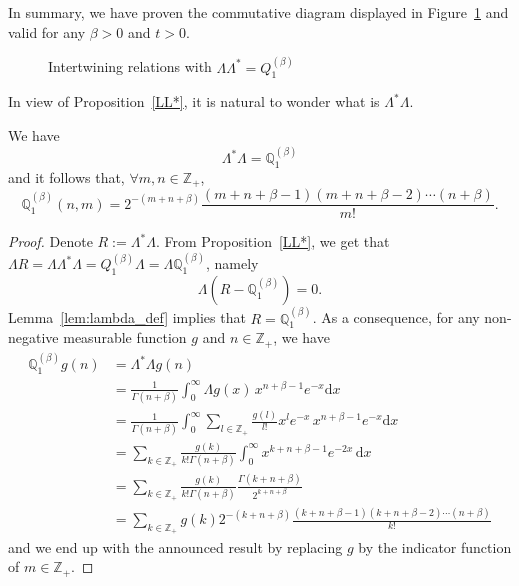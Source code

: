 \documentclass[AHL,Unicode,longabstracts]{cedram}
\newcommand{\df}{\mathrel{:=}}
\newcommand{\ZZ}{\mathbb{Z}}
\newcommand{\fm}{\mathfrak{m}}
\newcommand{\iy}{\infty}
\newcommand{\dBs}{{\discret{Q}}}
\newcommand{\Bs}{Q}
\newcommand{\esL}{\mathbf{L}}
\newcommand{\esLd}{\ell}
\newcommand{\discret}[1]{\mathds{#1}}
\newcommand{\adjL}{\Lambda^*}
\let\oldforall\forall
\renewcommand*{\forall}{\mathrel{\oldforall}}
\newcommand*{\dd}{\mathrm{d}}
\newcommand*{\dx}{\dd x}
\begin{document}
In summary, we have proven the commutative diagram displayed in Figure~\ref{fig1} and valid for any $\beta>0$ and $t>0$.

\begin{figure}[ht]\centering
{}
\caption{Intertwining relations with $\Lambda\adjL =\Bs^{(\beta)}_1$}\label{fig1}
\end{figure}

In view of Proposition~\ref{LL*}, it is natural to wonder what is $\adjL \Lambda$.

\begin{prop}\label{L*L}
We have
\[
\adjL \Lambda=\dBs^{(\beta)}_1
\]
and it follows that, $\forall m,n\in\ZZ_+$,
\[
\dBs^{(\beta)}_1(n,m)=2^{-(m+n+\beta)} \frac{(m+n+\beta-1)(m+n+\beta-2)\cdots (n+\beta)}{m!}.
\]
\end{prop}
\begin{proof}
Denote $R\df \adjL \Lambda$. From Proposition~\ref{LL*}, we get that $\Lambda R=\Lambda \adjL \Lambda =\Bs_1^{(\beta)}\Lambda=\Lambda \dBs_1^{(\beta)}$, namely
\[
\Lambda (R-\dBs^{(\beta)}_1)=0.
\]
Lemma~\ref{lem:lambda_def} implies that $R=\dBs^{(\beta)}_1$. As a consequence, for any non-negative measurable function $g$ and $n\in\ZZ_+$, we have
\begin{align*}
\dBs^{(\beta)}_1 g(n)&=
\adjL \Lambda g(n)\\&=
\frac1{\Gamma(n+\beta)}\int_0^{\iy} \Lambda g (x)\, x^{n+\beta-1}e^{-x}\dx\\
&=\frac1{\Gamma(n+\beta)}\int_0^{\iy} \sum_{l\in\ZZ_+}\frac{g(l)}{l!}x^l e^{-x}\, x^{n+\beta-1}e^{-x}\dx\\
&=\sum_{k\in\ZZ_+}\frac{g(k)}{k!\Gamma(n+\beta)}\int_0^{\iy} x^{k+n+\beta-1}e^{-2x}\,\dx\\
&=\sum_{k\in\ZZ_+}\frac{g(k)}{k!\Gamma(n+\beta)}\frac{\Gamma(k+n+\beta)}{2^{k+n+\beta}}\\
&=\sum_{k\in\ZZ_+} g(k)2^{-(k+n+\beta)} \frac{(k+n+\beta-1)(k+n+\beta-2)\cdots (n+\beta)}{k!}
\end{align*}
and we end up with the announced result by replacing $g$ by the indicator function of $m\in\ZZ_+$.
\end{proof}
\end{document}

